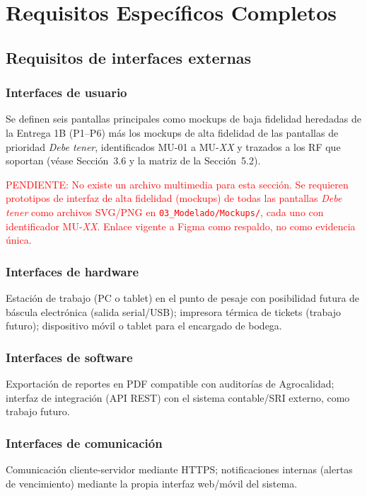\documentclass[11pt,a4paper]{article}
\begin{document}
\section{Requisitos Específicos Completos}
\subsection{Requisitos de interfaces externas}
\subsubsection{Interfaces de usuario}
Se definen seis pantallas principales como mockups de baja fidelidad heredadas de la Entrega 1B (P1--P6) más los mockups de alta fidelidad de las pantallas de prioridad \textit{Debe tener}, identificados MU-01 a MU-\textit{XX} y trazados a los RF que soportan (véase Sección~3.6 y la matriz de la Sección~5.2).

\textcolor{red}{PENDIENTE: No existe un archivo multimedia para esta sección. Se requieren prototipos de interfaz de alta fidelidad (mockups) de todas las pantallas \textit{Debe tener} como archivos SVG/PNG en \texttt{03\_Modelado/Mockups/}, cada uno con identificador MU-\textit{XX}. Enlace vigente a Figma como respaldo, no como evidencia única.}

\subsubsection{Interfaces de hardware}
Estación de trabajo (PC o tablet) en el punto de pesaje con posibilidad futura de báscula electrónica (salida serial/USB); impresora térmica de tickets (trabajo futuro); dispositivo móvil o tablet para el encargado de bodega.

\subsubsection{Interfaces de software}
Exportación de reportes en PDF compatible con auditorías de Agrocalidad; interfaz de integración (API REST) con el sistema contable/SRI externo, como trabajo futuro.

\subsubsection{Interfaces de comunicación}
Comunicación cliente-servidor mediante HTTPS; notificaciones internas (alertas de vencimiento) mediante la propia interfaz web/móvil del sistema.
\end{document}
